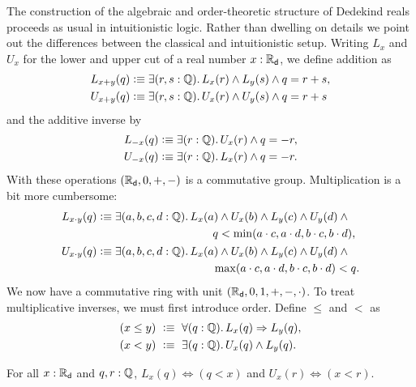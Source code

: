 The construction of the algebraic and order-theoretic structure of Dedekind reals proceeds
as usual in intuitionistic logic. Rather than dwelling on details we point out the
differences between the classical and intuitionistic setup. Writing $L_x$ and $U_x$ for
the lower and upper cut of a real number $x : \mathbb{R}_\mathsf{d}$, we define addition as%
%
\begin{align*}
  L_{x + y}(q) &\defeq \exis{r, s : \Q} L_x(r) \land L_y(s) \land q = r + s, \\
  U_{x + y}(q) &\defeq \exis{r, s : \Q} U_x(r) \land U_y(s) \land q = r + s
\end{align*}
%
and the additive inverse by
%
\begin{align*}
  L_{-x}(q) &\defeq \exis{r : \Q} U_x(r) \land q = - r, \\
  U_{-x}(q) &\defeq \exis{r : \Q} L_x(r) \land q = - r.
\end{align*}
%
With these operations $(\mathbb{R}_\mathsf{d}, 0, {+}, {-})$ is a commutative group. Multiplication is a bit
more cumbersome:
%
\begin{align*}
  L_{x \cdot y}(q) &\defeq
  \begin{aligned}[t]
    \exis{a, b, c, d : \Q} & L_x(a) \land U_x(b) \land L_y(c) \land U_y(d) \land {}\\
                           & \qquad q < \min (a \cdot c, a \cdot d, b \cdot c, b \cdot d),
  \end{aligned} \\
  U_{x \cdot y}(q) &\defeq
  \begin{aligned}[t]
    \exis{a, b, c, d : \Q} & L_x(a) \land U_x(b) \land L_y(c) \land U_y(d) \land {}\\
                           & \qquad \max (a \cdot c, a \cdot d, b \cdot c, b \cdot d) < q.
  \end{aligned}
\end{align*}
%
We now have a commutative ring with unit $(\mathbb{R}_\mathsf{d}, 0, 1, {+}, {-}, {\cdot})$. To treat
multiplicative inverses, we must first introduce order. Define $\leq$ and $<$ as
%
\begin{align*}
  (x \leq y) &\ \defeq \ \fall{q : \Q} L_x(q) \Rightarrow L_y(q), \\
  (x < y)    &\ \defeq \ \exis{q : \Q} U_x(q) \land L_y(q).
\end{align*}

\begin{lem} \label{dedekind-in-cut-as-le}
  For all $x : \mathbb{R}_\mathsf{d}$ and $q, r : \mathbb{Q}$, $L_x(q) \Leftrightarrow (q < x)$ and $U_x(r)
  \Leftrightarrow (x < r)$.
\end{lem}


